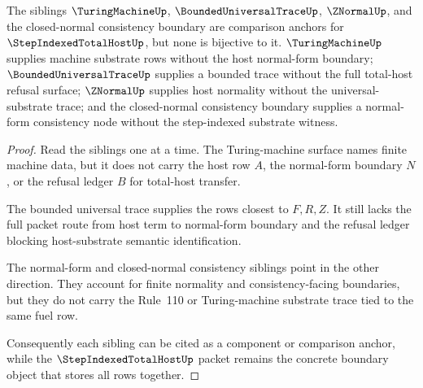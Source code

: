\begin{theorem}
\label{thm:step-indexed-total-host-sibling-boundary}
The siblings $\TuringMachineUp$, $\BoundedUniversalTraceUp$, $\ZNormalUp$, and the closed-normal consistency boundary are comparison anchors for $\StepIndexedTotalHostUp$, but none is bijective to it. $\TuringMachineUp$ supplies machine substrate rows without the host normal-form boundary; $\BoundedUniversalTraceUp$ supplies a bounded trace without the full total-host refusal surface; $\ZNormalUp$ supplies host normality without the universal-substrate trace; and the closed-normal consistency boundary supplies a normal-form consistency node without the step-indexed substrate witness.
\end{theorem}
\begin{proof}
Read the siblings one at a time. The Turing-machine surface names finite machine data, but it does not carry the host row $A$, the normal-form boundary $N$, or the refusal ledger $B$ for total-host transfer.

The bounded universal trace supplies the rows closest to $F,R,Z$. It still lacks the full packet route from host term to normal-form boundary and the refusal ledger blocking host-substrate semantic identification.

The normal-form and closed-normal consistency siblings point in the other direction. They account for finite normality and consistency-facing boundaries, but they do not carry the Rule~110 or Turing-machine substrate trace tied to the same fuel row.

Consequently each sibling can be cited as a component or comparison anchor, while the $\StepIndexedTotalHostUp$ packet remains the concrete boundary object that stores all rows together.
\end{proof}

